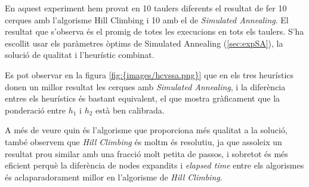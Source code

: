 
En aquest experiment hem provat en 10 taulers diferents el resultat de fer 10 cerques amb l'algorisme Hill Climbing i 10 amb el de \emph{Simulated Annealing}. El resultat que s'observa és el promig de totes les execucions en tots els taulers. S'ha escollit usar els paràmetres òptims de Simulated Annealing (\ref{sec:expSA}), la solució de qualitat i l'heurístic combinat.

Es pot observar en la figura \ref{fig:{images/hcvssa.png}} que en els tres heurístics donen un millor resultat les cerques amb \emph{Simulated Annealing}, i la diferència entres els heurístics és bastant equivalent, el que mostra gràficament que la ponderació entre $h_1$ i $h_2$ està ben calibrada.


A més de veure quin és l'algorisme que proporciona més qualitat a la solució, també observem que \emph{Hill Climbing} és moltm és resolutiu, ja que assoleix un resultat prou similar amb una fracció molt petita de passos, i sobretot és més eficient perquè la diferència de nodes expandits i \emph{elapsed time} entre els algorismes és aclaparadorament millor en l'algorisme de \emph{Hill Climbing}.
